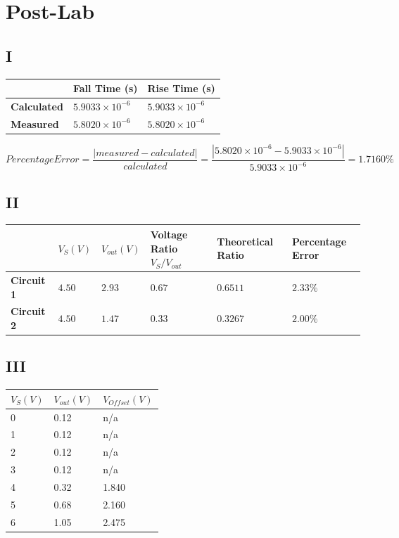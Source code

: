 \documentclass[10pt]{article}
\begin{document}
\section*{Post-Lab}
\subsection*{I}
\begin{table}[H]
	\centering
	\begin{tabular}{|l|l|l|}
		\hline
		 & \textbf{Fall Time (s)} & \textbf{Rise Time (s)} \\
		\hline
		\textbf{Calculated} & $5.9033 \times 10^{-6}$ & $5.9033 \times 10^{-6}$ \\
		\hline
		\textbf{Measured} & $5.8020 \times 10^{-6}$ & $5.8020 \times 10^{-6}$ \\
		\hline
	\end{tabular}
\end{table}

\noindent$$Percentage Error = \frac{|measured-calculated|}{calculated} = \frac{|5.8020 \times 10^{-6} - 5.9033 \times 10^{-6}|}{5.9033 \times 10^{-6}} = 1.7160\%$$

\subsection*{II}
\begin{table}[H]
	\centering
	\begin{tabular}{|l|l|l|l|l|l|}
		\hline
		 & \textbf{$V_S (V)$} & \textbf{$V_{out} (V)$} & \textbf{Voltage Ratio $V_S/V_{out}$} & \textbf{Theoretical Ratio} & \textbf{Percentage Error} \\
		\hline
		\textbf{Circuit 1} & $4.50$ & $2.93$ & $0.67$ & $0.6511$ & $2.33\%$ \\
		\hline
		\textbf{Circuit 2} & $4.50$ & $1.47$ & $0.33$ & $0.3267$ & $2.00\%$ \\
		\hline
	\end{tabular}
\end{table}

\subsection*{III}
\begin{table}[H]
	\centering
	\begin{tabular}{|l|l|l|}
		\hline
		\textbf{$V_S (V)$} & \textbf{$V_{out} (V)$} & \textbf{$V_{Offset} (V)$} \\
		\hline
		0 & 0.12 & n/a \\
		\hline
		1 & 0.12 & n/a \\
		\hline
		2 & 0.12 & n/a \\
		\hline
		3 & 0.12 & n/a \\
		\hline
		4 & 0.32 & 1.840 \\
		\hline
		5 & 0.68 & 2.160 \\
		\hline
		6 & 1.05 & 2.475 \\
		\hline
	\end{tabular}
\end{table}
\end{document}
